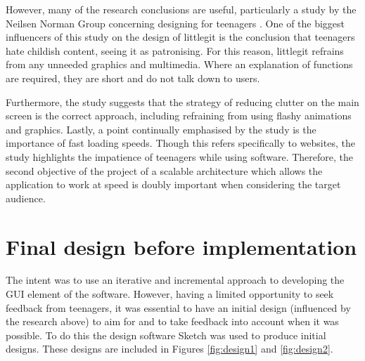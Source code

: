 However, many of the research conclusions are useful, particularly a study by the Neilsen Norman Group concerning designing for teenagers \cite{teendesign}. One of the biggest influencers of this study on the design of littlegit is the conclusion that teenagers hate childish content, seeing it as patronising. For this reason, littlegit refrains from any unneeded graphics and multimedia. Where an explanation of functions are required, they are short and do not talk down to users.

Furthermore, the study suggests that the strategy of reducing clutter on the main screen is the correct approach, including refraining from using flashy animations and graphics. Lastly, a point continually emphasised by the study is the importance of fast loading speeds. Though this refers specifically to websites, the study highlights the impatience of teenagers while using software. Therefore, the second objective of the project of a scalable architecture which allows the application to work at speed is doubly important when considering the target audience.

\section{Final design before implementation}

The intent was to use an iterative and incremental approach to developing the GUI element of the software. However, having a limited opportunity to seek feedback from teenagers, it was essential to have an initial design (influenced by the research above) to aim for and to take feedback into account when it was possible. To do this the design software Sketch \cite{sketch} was used to produce initial designs. These designs are included in Figures \ref{fig:design1} and \ref{fig:design2}.





